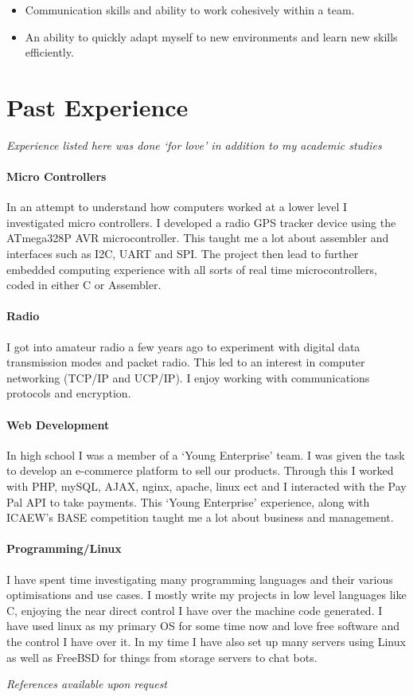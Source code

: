 \documentclass[9pt,a4paper]{article}
\begin{document}
\begin{multicols*}{2}
\begin{itemize}
\item Communication skills and ability to work cohesively within a team.

\item An ability to quickly adapt myself to new environments and learn new skills efficiently.
\end{itemize}

\section*{Past Experience}
\textit{Experience listed here was done `for love' in addition to my academic studies}

\paragraph{Micro Controllers} In an attempt to understand how computers worked at a lower level I investigated micro controllers.
I developed a radio GPS tracker device using the ATmega328P AVR microcontroller.
This taught me a lot about assembler and interfaces such as I2C, UART and SPI.
The project then lead to further embedded computing experience with all sorts of real time microcontrollers, coded in either C or Assembler.
\vspace*{-0.5cm}
\paragraph{Radio} I got into amateur radio a few years ago to experiment with digital data transmission modes and packet radio.
This led to an interest in computer networking (TCP/IP and UCP/IP).
I enjoy working with communications protocols and encryption.
\vspace*{-0.5cm}
\paragraph{Web Development} In high school I was a member of a `Young Enterprise' team.
I was given the task to develop an e-commerce platform to sell our products.
Through this I worked with PHP, mySQL, AJAX, nginx, apache, linux ect
and I interacted with the Pay Pal API to take payments.
This `Young Enterprise' experience, along with ICAEW's BASE competition taught me a lot about business and management.
\vspace*{-0.5cm}
\paragraph{Programming/Linux} I have spent time investigating many programming languages and their various optimisations and use cases.
I mostly write my projects in low level languages like C, enjoying the near direct control I have over the machine code generated.
I have used linux as my primary OS for some time now and love free software and the control I have over it.
In my time I have also set up many servers using Linux as well as FreeBSD for things from storage servers to chat bots.

\vfill
\textit{References available upon request}
\end{multicols*}
\end{document}
